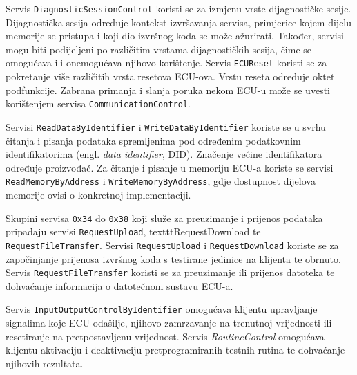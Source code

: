 \documentclass[times, utf8, diplomski, numeric]{fer}
\begin{document}
Servis \texttt{DiagnosticSessionControl} koristi se za izmjenu vrste dijagnostičke sesije. Dijagnostička sesija određuje kontekst izvršavanja servisa, primjerice kojem dijelu memorije se pristupa i koji dio izvršnog koda se može ažurirati. Također, servisi mogu biti podijeljeni po različitim vrstama dijagnostičkih sesija, čime se omogućava ili onemogućava njihovo korištenje. Servis \texttt{ECUReset} koristi se za pokretanje više različitih vrsta resetova ECU-ova. Vrstu reseta određuje oktet podfunkcije. Zabrana primanja i slanja poruka nekom ECU-u može se uvesti korištenjem servisa \texttt{CommunicationControl}.

Servisi \texttt{ReadDataByIdentifier} i \texttt{WriteDataByIdentifier} koriste se u svrhu čitanja i pisanja podataka spremljenima pod određenim podatkovnim identifikatorima (engl. \textit{data identifier}, DID). Značenje većine identifikatora određuje proizvođač. Za čitanje i pisanje u memoriju ECU-a koriste se servisi \texttt{ReadMemoryByAddress} i \texttt{WriteMemoryByAddress}, gdje dostupnost dijelova memorije ovisi o konkretnoj implementaciji\cite{falch2022uds, dissecto2023uds}.

Skupini servisa \texttt{0x34} do \texttt{0x38} koji služe za preuzimanje i prijenos podataka pripadaju servisi \texttt{RequestUpload}, texttt{RequestDownload} te \texttt{RequestFileTransfer}. Servisi \texttt{RequestUpload} i \texttt{RequestDownload} koriste se za započinjanje prijenosa izvršnog koda s testirane jedinice na klijenta te obrnuto. Servis \texttt{RequestFileTransfer} koristi se za preuzimanje ili prijenos datoteka te dohvaćanje informacija o datotečnom sustavu ECU-a.

Servis \texttt{InputOutputControlByIdentifier} omogućava klijentu upravljanje signalima koje ECU odašilje, njihovo zamrzavanje na trenutnoj vrijednosti ili resetiranje na pretpostavljenu vrijednost. Servis \textit{RoutineControl} omogućava klijentu aktivaciju i deaktivaciju pretprogramiranih testnih rutina te dohvaćanje njihovih rezultata.
\end{document}
